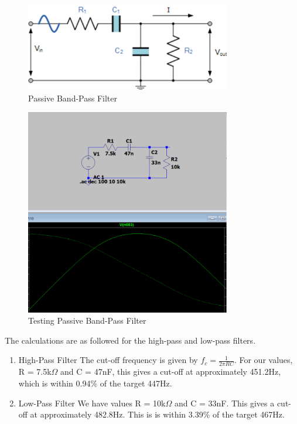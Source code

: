 \begin{figure}[h]
    \centering
    \includegraphics[width=0.8\textwidth]{subpages/images/passive_bp_filter.png}
    \caption{Passive Band-Pass Filter}
    \label{fig:passive_bp_filter}
\end{figure}
\begin{figure}[h]
    \centering
    \includegraphics[width=0.8\textwidth]{subpages/images/test_passive_bp.png}
    \caption{Testing Passive Band-Pass Filter}
    \label{fig:passive_bp_filter}
\end{figure}

The calculations are as followed for the high-pass and low-pass filters.
\begin{enumerate}
    \item High-Pass Filter
          The cut-off frequency is given by \(f_c = \frac{1}{2\pi RC}\).
          For our values, R = 7.5k$\Omega$ and C = 47nF, this gives a cut-off at approximately 451.2Hz, which is within 0.94\% of the target 447Hz.
    \item Low-Pass Filter
          We have values R = 10k$\Omega$ and C = 33nF. This gives a cut-off at approximately 482.8Hz. This is is within 3.39\% of the target 467Hz.
\end{enumerate}

